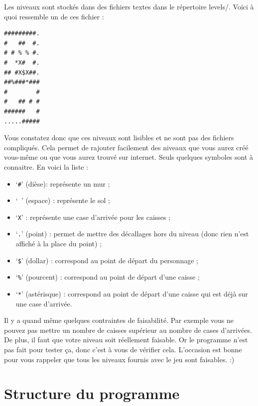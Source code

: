 \documentclass[a4paper,11pt,oneside]{article}
\newcommand{\file}[1]{\textsf{#1}}
\begin{document}
Les niveaux sont stockés dans des fichiers textes dans le répertoire \file{levels/}. Voici à quoi ressemble un de ces fichier :
\begin{verbatim}
#########.
#   ##  #.
# # % % #.
#  *X#  #.
## #X$X##.
##%###*###
#        #
#   ## # #
######   #
.....#####
\end{verbatim}%
Vous constatez donc que ces niveaux sont lisibles et ne sont pas des fichiers compliqués. Cela permet de rajouter facilement des
niveaux que vous aurez créé vous-même ou que vous aurez trouvé sur internet. Seuls quelques symboles sont à connaitre. En voici
la liste :
\begin{itemize}
	\item `\verb*|#|' (dièse): représente un mur ;
	\item `\verb*| |' (espace) : représente le sol ;
	\item `\verb*|X|' : représente une case d'arrivée pour les caisses ;
	\item `\verb*|.|' (point) : permet de mettre des décallages hors du niveau (donc rien n'est affiché à la place du point) ;
	\item `\verb*|$|' (dollar) : correspond au point de départ du personnage ;
	\item `\verb*|%|' (pourcent) : correspond au point de départ d'une caisse ;
	\item `\verb*|*|' (astérisque) : correspond au point de départ d'une caisse qui est déjà sur une case d'arrivée.
\end{itemize}
Il y a quand même quelques contraintes de faisabilité. Par exemple vous ne pouvez pas mettre un nombre de caisses supérieur au nombre
de cases d'arrivées. De plus, il faut que votre niveau soit réellement faisable. Or le programme n'est pas fait pour tester ça, donc
c'est à vous de vérifier cela. L'occasion est bonne pour vous rappeler que tous les niveaux fournis avec le jeu sont faisables. :)


\newpage
\section{Structure du programme}
\end{document}
